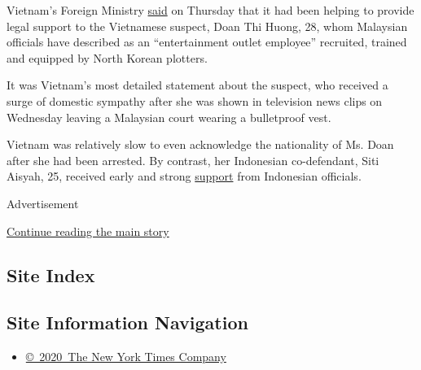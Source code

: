 Vietnam's Foreign Ministry
\href{http://www.mofa.gov.vn/en/tt_baochi/pbnfn/ns170227105211}{said} on
Thursday that it had been helping to provide legal support to the
Vietnamese suspect, Doan Thi Huong, 28, whom Malaysian officials have
described as an ``entertainment outlet employee'' recruited, trained and
equipped by North Korean plotters.

It was Vietnam's most detailed statement about the suspect, who received
a surge of domestic sympathy after she was shown in television news
clips on Wednesday leaving a Malaysian court wearing a bulletproof vest.

Vietnam was relatively slow to even acknowledge the nationality of Ms.
Doan after she had been arrested. By contrast, her Indonesian
co-defendant, Siti Aisyah, 25, received early and strong
\href{http://www.thestar.com.my/news/nation/2017/02/17/siti-aisyah-a-victim-says-indonesia-vice-president/}{support}
from Indonesian officials.

Advertisement

\protect\hyperlink{after-bottom}{Continue reading the main story}

\hypertarget{site-index}{%
\subsection{Site Index}\label{site-index}}

\hypertarget{site-information-navigation}{%
\subsection{Site Information
Navigation}\label{site-information-navigation}}

\begin{itemize}
\tightlist
\item
  \href{https://help.nytimes3xbfgragh.onion/hc/en-us/articles/115014792127-Copyright-notice}{©~2020~The
  New York Times Company}
\end{itemize}

